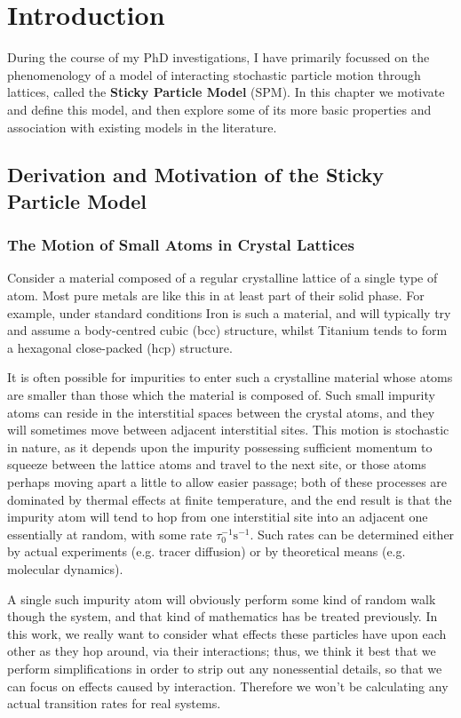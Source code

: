 \chapter{Introduction}
During the course of my PhD investigations, I have primarily focussed on the phenomenology of a model of
interacting stochastic particle motion through lattices, called the \textbf{Sticky Particle Model} (SPM). In
this chapter we motivate and define this model, and then explore some of its more basic properties and
association with existing models in the literature.

\section{Derivation and Motivation of the Sticky Particle Model}
\subsection{The Motion of Small Atoms in Crystal Lattices}
Consider a material composed of a regular crystalline lattice of a single type of atom. Most pure metals
are like this in at least part of their solid phase. For example, under standard conditions Iron is such
a material, and will typically try and assume a body-centred cubic (bcc) structure, whilst Titanium tends to
form a hexagonal close-packed (hcp) structure.

It is often possible for impurities to enter such a crystalline material whose atoms are smaller than those
which the material is composed of. Such small impurity atoms can reside in the interstitial spaces between 
the crystal atoms, and they will sometimes move between adjacent interstitial sites. This motion is
stochastic in nature, as it depends upon the impurity possessing sufficient momentum to squeeze between
the lattice atoms and travel to the next site, or those atoms perhaps moving apart a little to allow easier
passage; both of these processes are dominated by thermal effects at finite temperature, and the end result
is that the impurity atom will tend to hop from one interstitial site into an
adjacent one essentially at random, with some rate $\tau_0 ^{-1} \mathrm{s}^{-1}$.
Such rates can be determined either by actual experiments (e.g. tracer diffusion) or by theoretical means
(e.g. molecular dynamics).

A single such impurity atom will obviously perform some kind of random walk though the system, and that kind
of mathematics has be treated previously. In this work, we really want to consider what effects these
particles have upon each other as they hop around, via their interactions; thus, we think it best that we
perform simplifications in order to strip out any nonessential details, so that we can focus on effects 
caused by interaction. Therefore we won't be calculating any actual transition rates for real systems.

